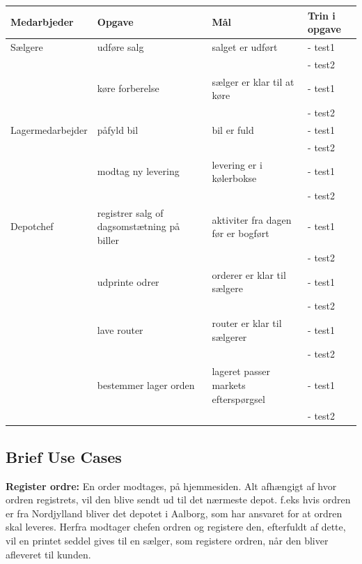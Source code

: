 \begin{center}
\begin{tabular}{ |p{90pt}|p{90pt}|p{90pt}|p{90pt}| }
    \hline
    Medarbjeder & Opgave & Mål & Trin i opgave \\
    \hline\hline
    Sælgere
    & udføre salg & salget er udført &
    - test1 \\
    &&&
    - test2 \\
    \hline
    & køre forberelse & sælger er klar til at køre &
    - test1 \\
    &&&
    - test2 \\
    \hline
    Lagermedarbejder
    & påfyld bil & bil er fuld &
    - test1 \\
    &&&
    - test2 \\
    \hline
    & modtag ny levering & levering er i kølerbokse &
    - test1 \\
    &&&
    - test2 \\
    \hline
    Depotchef
    & registrer salg of dagsomstætning på biller & aktiviter fra dagen før er bogført &
    - test1 \\
    &&&
    - test2 \\
    \hline
    & udprinte odrer & orderer er klar til sælgere &
    - test1 \\
    &&&
    - test2 \\
    \hline
    & lave router & router er klar til sælgerer &
    - test1 \\
    &&&
    - test2 \\
    \hline
    & bestemmer lager orden & lageret passer markets efterspørgsel &
    - test1 \\
    &&&
    - test2 \\
    \hline
\end{tabular}
\end{center}

\subsection{Brief Use Cases}\label{brief}
\textbf{Register ordre:}
En order modtages, på hjemmesiden. Alt afhængigt af hvor ordren registrets, vil den blive sendt ud til det nærmeste depot. f.eks hvis ordren er fra Nordjylland bliver det depotet i Aalborg, som har ansvaret for at ordren skal leveres. Herfra modtager chefen ordren og registere den, efterfuldt af dette, vil en printet seddel gives til en sælger, som registere ordren, når den bliver afleveret til kunden. 

